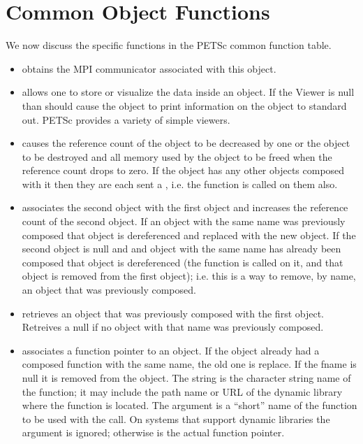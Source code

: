 \documentclass[twoside,12pt]{../sty/report_petsc}
\begin{document}
\section{Common Object Functions}

We now discuss the specific functions in the PETSc common function table.

\begin{itemize}
\item {} obtains the MPI communicator associated
      with this object.

\item {} allows one to store or visualize the data inside
      an object. If the Viewer is null than should cause the object to print 
      information on the object to standard out. PETSc provides a variety of simple
      viewers.

\item {} causes the reference count of the object to be decreased
      by one or the object to be destroyed and all memory used by the object to be freed when
      the reference count drops to zero.
      If the object has any other objects composed with it then they are each sent a
      , i.e. the  function is called on them also.

\item {} associates the second object with 
      the first object and increases the reference count of the second object. If an
      object with the 
      same name was previously composed that object is dereferenced and replaced with 
      the new object. If the 
      second object is null and and object with the same name has already been 
      composed that object is dereferenced (the  function is called on 
      it, and that object is removed from the first object); i.e. this is a way to 
      remove, by name, an object that was previously composed. 

\item {} retrieves an object that was 
      previously composed with the first object. Retreives a null if no object with 
      that name was previously composed.

\item {} associates a function
      pointer to an object. If the object already had a composed function with the 
      same name, the old one is replace. If the fname is null it is removed from 
      the object. The string  is the  character string name of the function;
      it may include the path name or URL of the dynamic library where the function is located.
      The argument  is a ``short'' name of the function to be used with the 
       call. On systems that support dynamic libraries the 
      argument is ignored; otherwise  is the actual function pointer.


\end{itemize}
\end{document}
